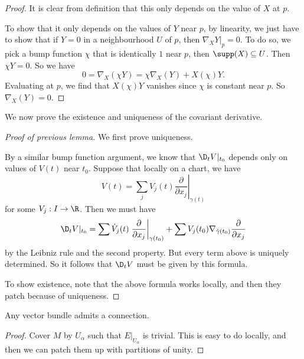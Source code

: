 \documentclass[a4paper]{article}
\begin{document}
\begin{proof}
  It is clear from definition that this only depends on the value of $X$ at $p$.

  To show that it only depends on the values of $Y$ near $p$, by linearity, we just have to show that if $Y = 0$ in a neighbourhood $U$ of $p$, then $\nabla_X Y|_p = 0$. To do so, we pick a bump function $\chi$ that is identically $1$ near $p$, then $\supp(X) \subseteq U$. Then $\chi Y = 0$. So we have
  \[
    0 = \nabla_X (\chi Y) = \chi \nabla_X(Y) + X(\chi) Y.
  \]
  Evaluating at $p$, we find that $X(\chi) Y$ vanishes since $\chi$ is constant near $p$. So $\nabla_X(Y) = 0$.
\end{proof}

We now prove the existence and uniqueness of the covariant derivative.
\begin{proof}[Proof of previous lemma]
  We first prove uniqueness.

  By a similar bump function argument, we know that $\D_t V|_{t_0}$ depends only on values of $V(t)$ near $t_0$. Suppose that locally on a chart, we have
  \[
    V(t) = \sum_j V_j(t) \left.\frac{\partial}{\partial x_j}\right|_{\gamma(t)}
  \]
  for some $V_j: I \to \R$. Then we must have
  \[
    \D_t V|_{t_0} = \sum \dot{V}_j (t) \left.\frac{\partial}{\partial x_j}\right|_{\gamma(t_0)} + \sum V_j(t_0) \nabla_{\dot{\gamma}(t_0)} \frac{\partial}{\partial x_j}
  \]
  by the Leibniz rule and the second property. But every term above is uniquely determined. So it follows that $\D_t V$ must be given by this formula.

  To show existence, note that the above formula works locally, and then they patch because of uniqueness.
\end{proof}

\begin{prop}
  Any vector bundle admits a connection.
\end{prop}

\begin{proof}
  Cover $M$ by $U_\alpha$ such that $E|_{U_\alpha}$ is trivial. This is easy to do locally, and then we can patch them up with partitions of unity.
\end{proof}
\end{document}
